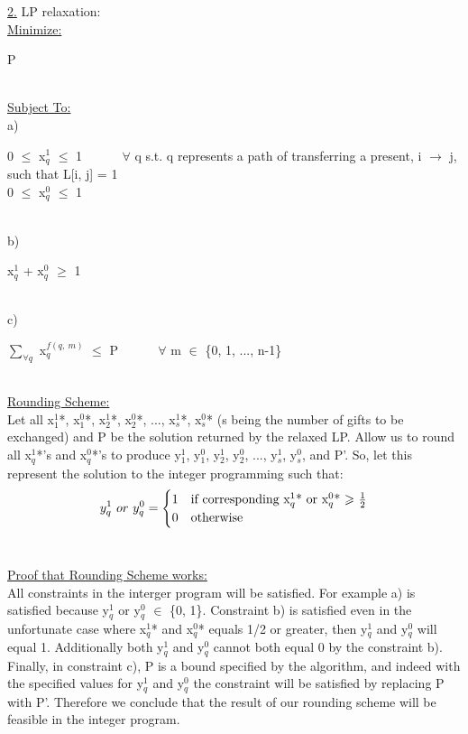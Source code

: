 \documentclass[10pt]{csc_assignment}
\begin{document}
\begin{description}
\underline{2.} LP relaxation:\\
\underline{Minimize:}\\
\hspace*{1cm}\parbox{15cm}{
P
}\\
\underline{Subject To:}\\
a) \\
\hspace*{1cm}\parbox{15cm}{
0 $\leqslant$ x$_{q}^1$ $\leqslant$ 1 ~~~~~ $\forall$ q s.t. q represents a path of transferring a present, i $\rightarrow$ j, such that L[i, j] = 1\\
0 $\leqslant$ x$_{q}^0$ $\leqslant$ 1 
}\\
b)\\
\hspace*{1cm}\parbox{15cm}{
x$_{q}^1$ + x$_{q}^0$ $\geqslant$ 1\\
}\\
c)\\
\hspace*{1cm}\parbox{15cm}{
$\sum_{\forall q}$ x$_{q}^{f(q,~ m)}$ $\leqslant$ P ~~~~~ $\forall$ m $\in$ \{0, 1, ..., n-1\}\\
}\\
\underline{Rounding Scheme:}\\
Let all x$_{1}^1$*, x$_{1}^0$*, x$_{2}^1$*, x$_{2}^0$*, ..., x$_{s}^1$*, x$_{s}^0$* (s being the number of gifts to be exchanged) and P be the solution returned by the relaxed LP. Allow us to round all x$_{q}^1$*'s and x$_{q}^0$*'s to produce y$_{1}^1$, y$_{1}^0$, y$_{2}^1$, y$_{2}^0$, ..., y$_{s}^1$, y$_{s}^0$, and P'. So, let this represent the solution to the integer programming such that:\\
\[
y_{q}^1 ~or~ y_{q}^0 = 
\begin{cases} 
      \hfill 1 \hfill & \text{if corresponding x$_{q}^1$* or x$_{q}^0$* $\geqslant$ $\frac{1}{2}$} \\
      \hfill 0 \hfill & \text{otherwise} \\
  \end{cases}
\]
 \\
\begin{flushleft}
\underline{Proof that Rounding Scheme works:}\\
All constraints in the interger program will be satisfied. For example a) is satisfied because y$_{q}^1$ or y$_{q}^0$ $\in$ \{0, 1\}. Constraint b) is satisfied even in the unfortunate case where x$_{q}^1$* and x$_{q}^0$* equals 1/2 or greater, then y$_{q}^1$ and y$_{q}^0$ will equal 1. Additionally both y$_{q}^1$ and y$_{q}^0$ cannot both equal 0 by the constraint b). Finally, in constraint c), P is a bound specified by the algorithm, and indeed with the specified values for y$_{q}^1$ and y$_{q}^0$ the constraint will be satisfied by replacing P with P'. Therefore we conclude that the result of our rounding scheme will be feasible in the integer program.\\

\end{flushleft}
\end{description}
\end{document}
